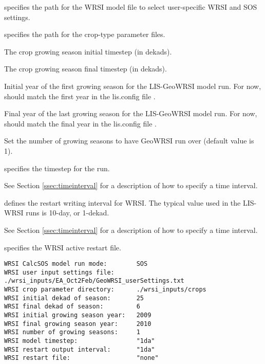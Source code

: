   specifies the path for the
 WRSI model file to select user-specific WRSI and SOS settings.

  specifies the path for the
 crop-type parameter files.

  The crop growing season
 initial timestep (in dekads).

  The crop growing season final
 timestep (in dekads).

  Initial year of the first
 growing season for the LIS-GeoWRSI model run.  For now, should
 match the first year in the lis.config file .

  Final year of the last
 growing season for the LIS-GeoWRSI model run.  For now, should
 match the final year in the lis.config file .

  Set the number of growing
 seasons to have GeoWRSI run over (default value is 1).

  specifies the timestep for the run.

 See Section \ref{ssec:timeinterval} for a description
 of how to specify a time interval.

  defines the restart
 writing  interval for WRSI. The typical value used in the
 LIS-WRSI runs is 10-day, or 1-dekad.

 See Section \ref{ssec:timeinterval} for a description
 of how to specify a time interval.

  specifies the WRSI active restart file.
 

 \begin{Verbatim}[frame=single]
WRSI CalcSOS model run mode:        SOS
WRSI user input settings file:      ./wrsi_inputs/EA_Oct2Feb/GeoWRSI_userSettings.txt
WRSI crop parameter directory:      ./wrsi_inputs/crops
WRSI initial dekad of season:       25
WRSI final dekad of season:         6
WRSI initial growing season year:   2009
WRSI final growing season year:     2010
WRSI number of growing seasons:     1
WRSI model timestep:                "1da"
WRSI restart output interval:       "1da"
WRSI restart file:                  "none"
 \end{Verbatim}




